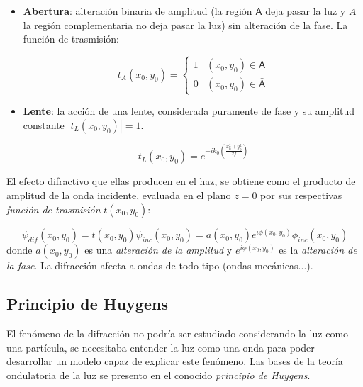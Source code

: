 \documentclass[12pt,a4paper]{book}
\numberwithin{equation}{section}
\numberwithin{figure}{section}
\newcommand{\parentesis}[1]{\left( #1  \right)}
\newcommand{\1}{_{(1)}}
\newcommand{\2}{_{(2)}}
\theoremstyle{definition}
\begin{document}
\begin{itemize}
    \item \textbf{Abertura}: alteración binaria de amplitud (la región $\mathsf{A}$ deja pasar la luz y $\bar{A}$ la región complementaria no deja pasar la luz) sin alteración de la fase. La función de trasmisión:

    \begin{equation}
        t_A(x_0,y_0) = \left\lbrace \begin{array}{cc}
            1 & (x_0,y_0) \in \mathsf{A} \\
            0 & (x_0,y_0) \in \mathsf{\bar{A}}
        \end{array} \right.
    \end{equation}
    
    \item \textbf{Lente}: la acción de una lente, considerada puramente de fase y su amplitud constante $|t_L (x_0,y_0)|=1$. 
    
    \begin{equation}
        t_L(x_0,y_0) = e^{-ik_0\parentesis{\frac{x_0^2+y_0^2}{2f}}}
    \end{equation}
\end{itemize}
El efecto difractivo que ellas producen en el haz, se obtiene como el producto de amplitud de la onda incidente, evaluada en el plano $z=0$ por sus respectivas \textit{función de trasmisión} $t(x_0,y_0)$:

\begin{equation}
    \psi_{dif} (x_0,y_0) = t(x_0,y_0) \psi_{inc} (x_0,y_0) = a(x_0,y_0) e^{i\phi (x_0,y_0)} \phi_{inc} (x_0,y_0)
\end{equation}
donde $a(x_0,y_0)$ es una \textit{alteración de la amplitud} y $e^{i\phi (x_0,y_0)}$ es la \textit{alteración de la fase}. La difracción afecta a ondas de todo tipo (ondas mecánicas...). \\

\subsection{Principio de Huygens}

El fenómeno de la difracción no podría ser estudiado considerando la luz como una partícula, se necesitaba entender la luz como una onda para poder desarrollar un modelo capaz de explicar este fenómeno. Las bases de la teoría ondulatoria de la luz se presento en el conocido \textit{principio de Huygens}. \\
\end{document}
